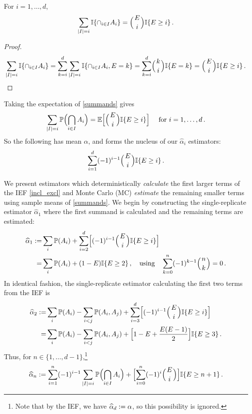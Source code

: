 \begin{proposition} \label{prop:means_of_binomial}
For $i = 1,\dots, d$,
\begin{equation} \label{summands}
  \sum_{\card{I}=i} \ind{\cap_{i\in I}A_i} = \BigBinom{E}{i} \ind{E \ge i}  \,.
\end{equation}
\end{proposition}
\begin{proof}
\begin{align*}
\sum_{\card{I}=i} \ind{ \cap_{i\in I}A_i } =
\sum_{k=i}^{d} \sum_{\card{I}=i} \ind{ \cap_{i\in I}A_i, E = k }
= \sum_{k=i}^{d} \BigBinom{k}{i} \ind{E = k }
= \BigBinom{E}{i} \ind{E \ge i} \,.
\end{align*}
\end{proof}
Taking the expectation of \eqref{summands} gives
\begin{equation*}
 \sum_{\card{I}=i} \Prob\Bigl(\bigcap_{i\in I}A_i\Bigr) = \Exp\Bigl[ \BigBinom{E}{i} \ind{E \ge i} \Bigr] \quad \text{ for } i=1,\dots,d \,.
\end{equation*}
So the following has mean $\alpha$, and forms the nucleus of our $\hat{\alpha}_i$ estimators:
\begin{equation} \label{estimator_incl_excl}
	\sum_{i=1}^d (-1)^{i-1} \BigBinom{E}{i} \ind{E\ge i} \,.
\end{equation}

We present estimators which deterministically \emph{calculate} the first larger terms of the IEF \eqref{incl_excl} and Monte Carlo (MC) \emph{estimate} the remaining smaller terms using sample means of \eqref{summands}.
We begin by constructing the single-replicate estimator $\hat{\alpha}_1$
where the first summand is calculated and the remaining terms are estimated:
\begin{align} \label{eq:alpha_1_hat}
	\hat{\alpha}_1 \defeq& \sum_i \Prob(A_i)  + \sum_{i=2}^d \Bigl[ (-1)^{i-1} \BigBinom{E}{i} \ind{E \ge i} \Bigr] \notag \\
	=& \sum_i \Prob(A_i)
+ (1 - E) \ind{E \ge 2 } \,, \quad \text{using} \quad \sum_{k=0}^n (-1)^{k-1} \BigBinom{n}{k} = 0 \,.
\end{align}
In identical fashion, the single-replicate estimator calculating the first two terms from the IEF is
\begin{align} \label{eq:alpha_2_hat}
	\hat{\alpha}_2
	\defeq& \sum_i \Prob(A_i) - \sum_{i<j}\Prob(A_i, A_j) + \sum_{i=3}^d \Bigl[ (-1)^{i-1} \BigBinom{E}{i} \ind{E \ge i} \Bigr] \notag \\
	=& \sum_i \Prob(A_i) - \sum_{i<j}\Prob(A_i, A_j) + \Bigl[1 - E + \frac{E (E-1)}{2} \Bigr] \ind{E \ge 3} \,.
\end{align}
Thus, for $n \in \{1,\dots,d-1\}$,\footnote{Note that by the IEF, we have
$\widehat{\alpha}_d:=\alpha$, so this possibility is ignored.}
\begin{equation} \label{hat_alpha_n}
	\hat{\alpha}_n \defeq
\sum_{i=1}^n (-1)^{i-1} \sum_{\card{I}=i} \Prob\Bigl( \bigcap_{i\in I} A_i \Bigr)
+ \Bigl[ \sum_{i=0}^n (-1)^{i} \BigBinom{E}{i} \Bigr] \ind{ E \ge n+1} \,.
\end{equation}

